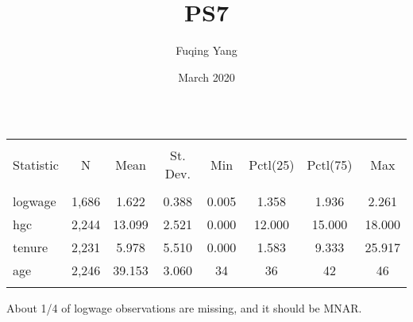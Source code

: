\documentclass{article}
\title{PS7}
\author{Fuqing Yang }
\date{March 2020}
\begin{document}
\maketitle

\section{}
\begin{table}[!htbp] \centering 
  \caption{} 
  \label{} 
\begin{tabular}{@{\extracolsep{5pt}}lccccccc} 
\\[-1.8ex]\hline 
\hline \\[-1.8ex] 
Statistic & \multicolumn{1}{c}{N} & \multicolumn{1}{c}{Mean} & \multicolumn{1}{c}{St. Dev.} & \multicolumn{1}{c}{Min} & \multicolumn{1}{c}{Pctl(25)} & \multicolumn{1}{c}{Pctl(75)} & \multicolumn{1}{c}{Max} \\ 
\hline \\[-1.8ex] 
logwage & 1,686 & 1.622 & 0.388 & 0.005 & 1.358 & 1.936 & 2.261 \\ 
hgc & 2,244 & 13.099 & 2.521 & 0.000 & 12.000 & 15.000 & 18.000 \\ 
tenure & 2,231 & 5.978 & 5.510 & 0.000 & 1.583 & 9.333 & 25.917 \\ 
age & 2,246 & 39.153 & 3.060 & 34 & 36 & 42 & 46 \\ 
\hline \\[-1.8ex] 
\end{tabular} 
\end{table}  
About 1/4 of logwage observations are missing, and it should be MNAR.
\end{document}
